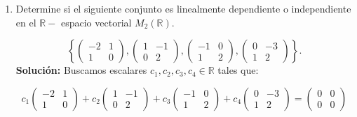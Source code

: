\documentclass[a4paper]{article}
\begin{document}
\begin{enumerate}
\begin{enumerate}
Por lo tanto,
\[
\boxed{H \text{ es un subespacio vectorial de } P_2[\mathbb{R}]}
\]

\item Base y dimensión de $H$

Todo elemento de $H$ tiene la forma:

\[
p(x) = a(x^2 + 2)
\]

Por lo tanto, el conjunto $\{x^2 + 2\}$ genera $H$ y es linealmente independiente.

\[
\text{Base de } H: \quad \boxed{ \{ x^2 + 2 \} }
\]

\[
\text{Dimensión de } H: \quad \boxed{1}
\]


\end{enumerate}


\item Determine si el siguiente conjunto es linealmente dependiente o independiente en el $\mathbb{R}-$ espacio vectorial $M_{2}(\mathbb{R})$.

\[\left\{\begin{pmatrix} -2 & 1 \\ 1 & 0 \end{pmatrix},\begin{pmatrix} 1 & -1 \\ 0 & 2 \end{pmatrix},\begin{pmatrix} -1 & 0 \\ 1 & 2 \end{pmatrix},\begin{pmatrix} 0 & -3 \\ 1 & 2 \end{pmatrix}\right\}. \]
\textbf{Solución:}
Buscamos escalares \( c_1, c_2, c_3, c_4 \in \mathbb{R} \) tales que:

\[
c_1 \begin{pmatrix} -2 & 1 \\ 1 & 0 \end{pmatrix} + 
c_2 \begin{pmatrix} 1 & -1 \\ 0 & 2 \end{pmatrix} +
c_3 \begin{pmatrix} -1 & 0 \\ 1 & 2 \end{pmatrix} + 
c_4 \begin{pmatrix} 0 & -3 \\ 1 & 2 \end{pmatrix}
= \begin{pmatrix} 0 & 0 \\ 0 & 0 \end{pmatrix}
\]


\end{enumerate}
\end{document}
